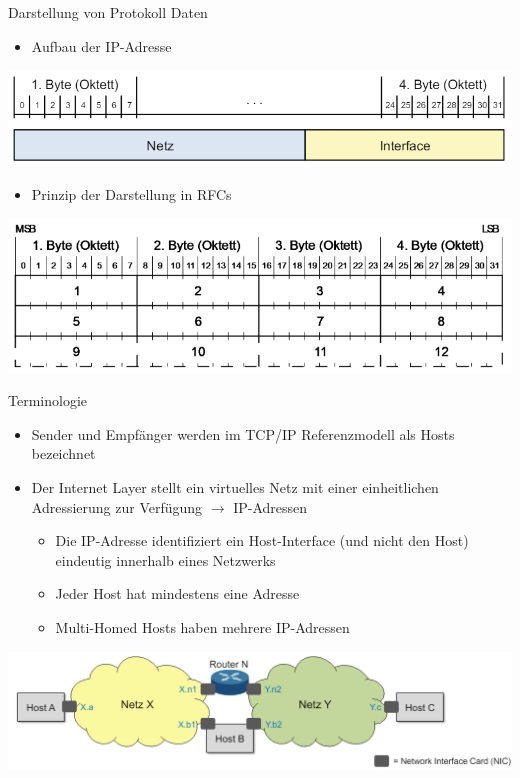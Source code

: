 \begin{concept}{Darstellung von Protokoll Daten}
    \begin{itemize}
        \item Aufbau der IP-Adresse
    \end{itemize}
        \includegraphics[width=1\linewidth]{images/aufbau_ip_adresse.png}
    \begin{itemize}
        \item Prinzip der Darstellung in RFCs
    \end{itemize}
        \includegraphics[width=1\linewidth]{images/darstellung_ip_rfc.png}
\end{concept}

\begin{definition}{Terminologie}
    \begin{itemize}
        \item Sender und Empfänger werden im TCP/IP Referenzmodell als Hosts bezeichnet
        \item Der Internet Layer stellt ein virtuelles Netz mit einer einheitlichen Adressierung zur Verfügung $\rightarrow$ IP-Adressen
        \begin{itemize}
            \item Die IP-Adresse identifiziert ein Host-Interface (und nicht den Host) eindeutig innerhalb eines Netzwerks
            \item Jeder Host hat mindestens eine Adresse
            \item Multi-Homed Hosts haben mehrere IP-Adressen
        \end{itemize}
    \end{itemize}
    \includegraphics[width=1\linewidth]{images/ip_adressen_terminologie.png}
\end{definition}

